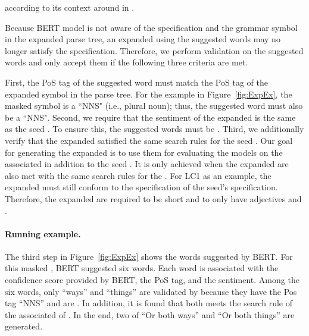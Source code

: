 according to its context  around in
\sent.    

Because BERT model is not aware of the \lc
specification and the grammar symbol in the expanded parse tree, an
expanded \sent using the suggested words may no longer satisfy the
\lc specification. Therefore, we perform validation
on the suggested words and only accept them if the following three
criteria are met.

First, the PoS tag of the suggested word must match the PoS tag of the
expanded symbol in the parse tree. For the example in
Figure~\ref{fig:ExpEx}, the masked symbol is a ``NNS" (i.e., plural
noun); thus, the suggested word must also be a ``NNS".   Second, we require that
the sentiment of the expanded \sent is the same as the seed
\sent. To ensure this, the suggested words must be \neu.
  Third, we additionally verify that the expanded \sents
satisfied the same search rules for the seed \sent. Our goal for
generating the expanded \sents is to use them for evaluating the
\sa models on the associated \lc in addition to the seed \sent. It
is only achieved when the expanded \sents are also met with the
same search rules for the \lc. For LC1 as an example, the expanded
\sent must still conform to the specification of the seed's \lc
specification. Therefore, the expanded \sents are required to be
short and to only have \neu adjectives and \nns.   

\paragraph{Running example.} The third step in Figure~\ref{fig:ExpEx} shows the words suggested
by BERT. For this masked \sent, BERT suggested six words. Each word
is associated with the confidence score provided by BERT, the PoS tag,
and the sentiment. Among the six words, only ``ways'' and ``things''
are validated by \tool{} because they have the Pos tag ``NNS'' and are
\neu. In addition, it is found that both \sents meets the search
rule of the associated \lc of \SareqExOne. In the end, two \sents
of ``Or both ways'' and ``Or both things'' are generated.  


